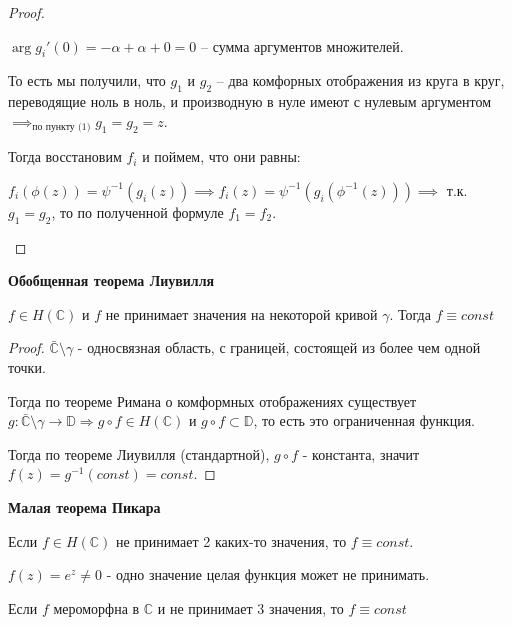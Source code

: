 \begin{proof}
\begin{enumerate}
{\begin{enumerate}
{                    $\arg g_i'(0) = -\alpha + \alpha + 0 = 0$ -- сумма аргументов множителей.
                }
            \end{enumerate}

            То есть мы получили, что $g_1$ и $g_2$ -- два комфорных отображения из круга в круг, переводящие ноль в ноль, и производную в нуле имеют с нулевым аргументом $\implies_{\text{по пункту (1)}} g_1 = g_2 = z$.

            Тогда восстановим $f_i$ и поймем, что они равны:

            $f_i(\phi(z)) = \psi^{-1}(g_i(z)) \implies f_i(z) = \psi^{-1}(g_i(\phi^{-1}(z))) \implies$ т.к. $g_1 = g_2$, то по полученной формуле $f_1 = f_2$.
        }
    \end{enumerate}
\end{proof}

\begin{consequence}
    \textbf{Обобщенная теорема Лиувилля}

    $f \in H(\mathbb{C})$ и $f$ не принимает значения на некоторой кривой $\gamma$. Тогда
    $f \equiv const$
\end{consequence}

\begin{proof}
    $\bar{\mathbb{C}} \setminus \gamma$ - односвязная область, с границей, состоящей из более чем одной точки.

    Тогда по теореме Римана о комформных отображениях существует $g : \bar{\mathbb{C}} \setminus \gamma \to \mathbb{D} \Rightarrow g \circ f \in H(\mathbb{C})$ и $g \circ f \subset \mathbb{D}$, то есть
    это ограниченная функция.

    Тогда по теореме Лиувилля (стандартной), $g \circ f$ - константа, значит
    $f(z) = g^{-1} (const) = const$.
\end{proof}

\begin{remark}
    \textbf{Малая теорема Пикара}

    Если $f \in H(\mathbb{C})$ не принимает 2 каких-то значения, то
    $f \equiv const$.
\end{remark}

\begin{example}
    $f(z) = e^z \neq 0$ - одно значение целая функция может не принимать.
\end{example}

\begin{consequence}
    Если $f$ мероморфна в $\mathbb{C}$ и не принимает 3 значения, то $f \equiv const$
\end{consequence}

